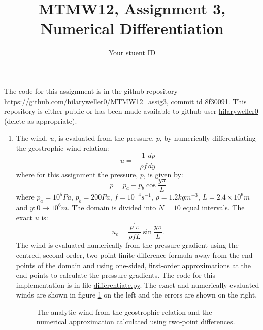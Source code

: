 \documentclass[12pt]{article}
\begin{document}
\thispagestyle{empty}

\title{MTMW12, Assignment 3, Numerical Differentiation}
\author{Your stuent ID}
\maketitle

The code for this assignment is in the github repository\\
\url{https://github.com/hilaryweller0/MTMW12_assig3}, commit id 8f30091. This repository is either public or has been made available to github user \url{hilaryweller0} (delete as appropriate).

\begin{enumerate}
\item The wind, $u$, is evaluated from the pressure, $p$, by numerically differentiating the geostrophic wind relation:
\begin{equation}
u = -\frac{1}{\rho f}\frac{dp}{dy}
\label{eq:geoWind}
\end{equation}
where for this assignment the pressure, $p$, is given by:
\begin{equation}
p = p_a + p_b \cos\frac{y\pi}{L}
\label{eq:cosPressure}
\end{equation}
where $p_a=10^5 Pa$, $p_b=200 Pa$, $f = 10^{-4}s^{-1}$, $\rho=1.2 kg m^{-3}$, $L = 2.4\times 10^6 m$ and $y:0\rightarrow 10^6 m$. The domain is divided into $N=10$ equal intervals. The exact $u$ is:
\begin{equation}
u_e = \frac{p^\prime\pi}{\rho f L}\sin\frac{y\pi}{L}.
\label{eq:exactU}
\end{equation}
The wind is evaluated numerically from the pressure gradient using the centred, second-order, two-point finite difference formula away from the end-points of the domain and using one-sided, first-order approximations at the end points to calculate the pressure gradients. The code for this implementation is in file \url{differentiate.py}. The exact and numerically evaluated winds are shown in figure \ref{fig:u2pt} on the left and the errors are shown on the right.

\begin{figure}[htb]
\centerline{}
\caption{The analytic wind from the geostrophic relation and the numerical approximation calculated using two-point differences.}
\label{fig:u2pt}
\end{figure}


\end{enumerate}
\end{document}
